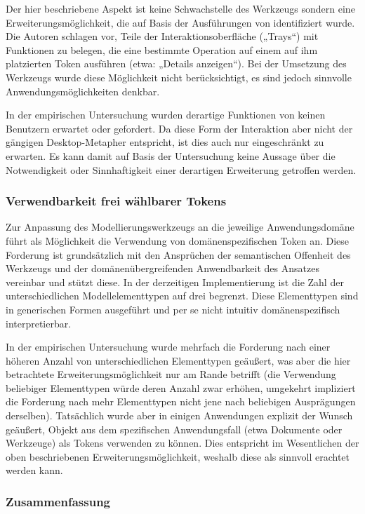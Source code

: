 Der hier beschriebene Aspekt ist keine Schwachstelle des Werkzeugs sondern eine Erweiterungsmöglichkeit, die auf Basis der Ausführungen von \citet{Ishii97} identifiziert wurde. Die Autoren schlagen vor, Teile der Interaktionsoberfläche („Trays“) mit Funktionen zu belegen, die eine bestimmte Operation auf einem auf ihm platzierten Token ausführen (etwa: „Details anzeigen“). Bei der Umsetzung des Werkzeugs wurde diese Möglichkeit nicht berücksichtigt, es sind jedoch sinnvolle Anwendungsmöglichkeiten denkbar.

In der empirischen Untersuchung wurden derartige Funktionen von keinen Benutzern erwartet oder gefordert. Da diese Form der Interaktion aber nicht der gängigen Desktop-Metapher entspricht, ist dies auch nur eingeschränkt zu erwarten. Es kann damit auf Basis der Untersuchung keine Aussage über die Notwendigkeit oder Sinnhaftigkeit einer derartigen Erweiterung getroffen werden.

\subsubsection{Verwendbarkeit frei wählbarer Tokens}

Zur Anpassung des Modellierungswerkzeugs an die jeweilige Anwendungsdomäne führt \citet{Holmquist99} als Möglichkeit die Verwendung von domänenspezifischen Token an. Diese Forderung ist grundsätzlich mit den Ansprüchen der semantischen Offenheit des Werkzeugs und der domänenübergreifenden Anwendbarkeit des Ansatzes vereinbar und stützt diese. In der derzeitigen Implementierung ist die Zahl der unterschiedlichen Modellelementtypen auf drei begrenzt. Diese Elementtypen sind in generischen Formen ausgeführt und per se nicht intuitiv domänenspezifisch interpretierbar.

In der empirischen Untersuchung wurde mehrfach die Forderung nach einer höheren Anzahl von unterschiedlichen Elementtypen geäußert, was aber die hier betrachtete Erweiterungsmöglichkeit nur am Rande betrifft (die Verwendung beliebiger Elementtypen würde deren Anzahl zwar erhöhen, umgekehrt impliziert die Forderung nach mehr Elementtypen nicht jene nach beliebigen Ausprägungen derselben). Tatsächlich wurde aber in einigen Anwendungen explizit der Wunsch geäußert, Objekt aus dem spezifischen Anwendungsfall (etwa Dokumente oder Werkzeuge) als Tokens verwenden zu können. Dies entspricht im Wesentlichen der oben beschriebenen Erweiterungsmöglichkeit, weshalb diese als sinnvoll erachtet werden kann. 

\subsubsection{Zusammenfassung} %
\label{ssub:gegenüberstellung_zusammenfassung}

